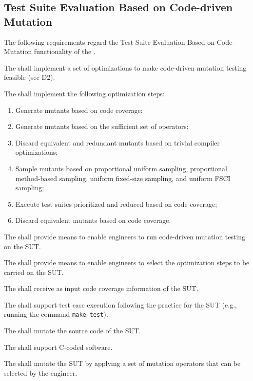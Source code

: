 

\subsection{Test Suite Evaluation Based on Code-driven Mutation}
\label{sec:codeDriven}

The following requirements regard the Test Suite Evaluation Based on Code-Mutation functionality of the \FAQAS.

\RQ{} The \FAQAS shall implement a set of optimizations to make code-driven mutation testing feasible (see D2).

\RQ{} The \FAQAS shall implement the following optimization steps:
\begin{enumerate}
	\item Generate mutants based on code coverage;
	\item Generate mutants based on the sufficient set of operators;
	\item Discard equivalent and redundant mutants based on trivial compiler optimizations;
	\item Sample mutants based on proportional uniform sampling, proportional method-based sampling, uniform fixed-size sampling, and uniform FSCI sampling;
	\item Execute test suites prioritized and reduced based on code coverage;
	\item Discard equivalent mutants based on code coverage.
\end{enumerate}

\RQ{} The \FAQAS shall provide means to enable engineers to run code-driven mutation testing on the SUT.

\RQ{} The \FAQAS shall provide means to enable engineers to select the optimization steps to be carried on the SUT.

\RQ{} The \FAQAS shall receive as input code coverage information of the SUT.

\RQ{} The \FAQAS shall support test case execution following the practice for the SUT (e.g., running the command \texttt{make test}).

\RQ{} The \FAQAS shall mutate the source code of the SUT.

\RQ{} The \FAQAS shall support C-coded software.

\RQ{} The \FAQAS shall mutate the SUT by applying a set of mutation operators that can be selected by the engineer.

